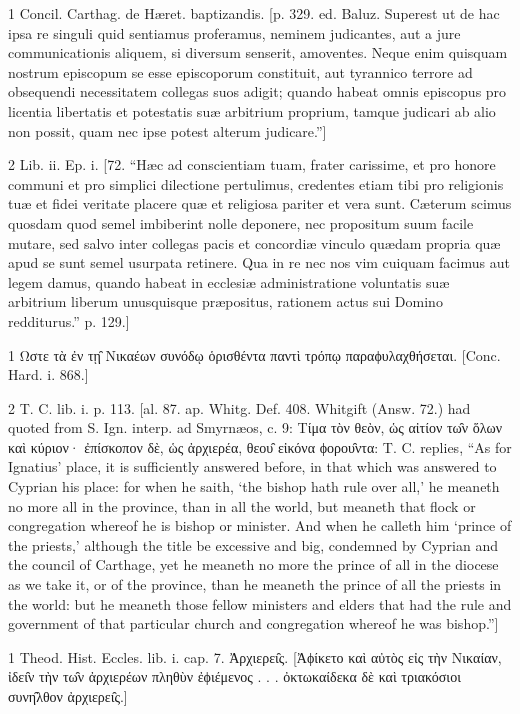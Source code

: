 1
Concil. Carthag. de Hæret. baptizandis. [p. 329. ed. Baluz. Superest ut de hac ipsa re singuli quid sentiamus proferamus, neminem judicantes, aut a jure communicationis aliquem, si diversum senserit, amoventes. Neque enim quisquam nostrum episcopum se esse episcoporum constituit, aut tyrannico terrore ad obsequendi necessitatem collegas suos adigit; quando habeat omnis episcopus pro licentia libertatis et potestatis suæ arbitrium proprium, tamque judicari ab alio non possit, quam nec ipse potest alterum judicare.”]

2
Lib. ii. Ep. i. [72. “Hæc ad conscientiam tuam, frater carissime, et pro honore communi et pro simplici dilectione pertulimus, credentes etiam tibi pro religionis tuæ et fidei veritate placere quæ et religiosa pariter et vera sunt. Cæterum scimus quosdam quod semel imbiberint nolle deponere, nec propositum suum facile mutare, sed salvo inter collegas pacis et concordiæ vinculo quædam propria quæ apud se sunt semel usurpata retinere. Qua in re nec nos vim cuiquam facimus aut legem damus, quando habeat in ecclesiæ administratione voluntatis suæ arbitrium liberum unusquisque præpositus, rationem actus sui Domino redditurus.” p. 129.]

1
Ωστε τὰ ἐν τῃ̑ Νικαέων συνόδῳ ὁρισθέντα παντὶ τρόπῳ παραϕυλαχθήσεται. [Conc. Hard. i. 868.]

2
T. C. lib. i. p. 113. [al. 87. ap. Whitg. Def. 408. Whitgift (Answ. 72.) had quoted from S. Ign. interp. ad Smyrnæos, c. 9: Τίμα τὸν θεὸν, ὡς αἰτίον τω̑ν ὅλων καὶ κύριον· ἐπίσκοπον δὲ, ὡς ἀρχιερέα, θεου̑ εἰκόνα ϕορου̑ντα: T. C. replies, “As for Ignatius’ place, it is sufficiently answered before, in that which was answered to Cyprian his place: for when he saith, ‘the bishop hath rule over all,’ he meaneth no more all in the province, than in all the world, but meaneth that flock or congregation whereof he is bishop or minister. And when he calleth him ‘prince of the priests,’ although the title be excessive and big, condemned by Cyprian and the council of Carthage, yet he meaneth no more the prince of all in the diocese as we take it, or of the province, than he meaneth the prince of all the priests in the world: but he meaneth those fellow ministers and elders that had the rule and government of that particular church and congregation whereof he was bishop.”]

1
Theod. Hist. Eccles. lib. i. cap. 7. Ἀρχιερει̑ς. [Ἀϕίκετο καὶ αὐτὸς εἰς τὴν Νικαίαν, ἰδει̑ν τὴν τω̑ν ἀρχιερέων πληθὺν ἐϕιέμενος . . . ὀκτωκαίδεκα δὲ καὶ τριακόσιοι συνη̑λθον ἀρχιερει̑ς.]

